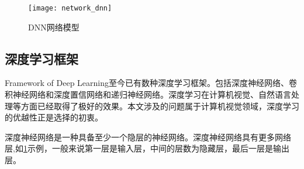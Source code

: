 \begin{figure}[!h]
	\centering
	\texttt{[image: network\_dnn]}
	\caption[]{\label{fig:network_dnn}
	DNN网络模型
	}
\end{figure}

\subsection{深度学习框架}{Framework of Deep Learning}\cite{ wiki:Deep_learning}至今已有数种深度学习框架。包括深度神经网络、卷积神经网络和深度置信网络和递归神经网络。深度学习在计算机视觉、自然语言处理等方面已经取得了极好的效果。本文涉及的问题属于计算机视觉领域，深度学习的优越性正是选择的初衷。

深度神经网络是一种具备至少一个隐层的神经网络。深度神经网络具有更多网络层,如\cref{fig:network_dnn}示例，一般来说第一层是输入层，中间的层数为隐藏层，最后一层是输出层。

